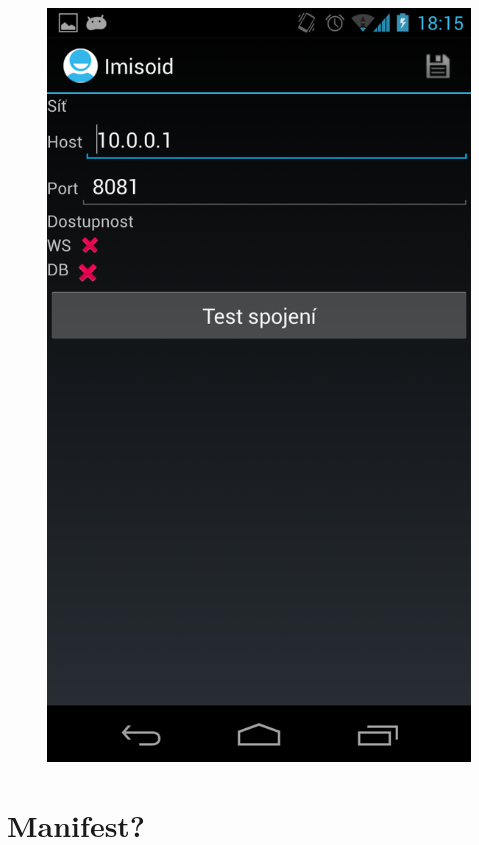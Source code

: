 \documentclass{diplomka}
\begin{document}
\begin{figure}[H]
  \centering
  \includegraphics[scale=0.3]{scr/network.png}
  \label{}
\end{figure}

\chapter{Manifest?}
\end{document}

